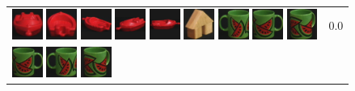 \begin{figure}[!p]
\begin{center}
\begin{tabular}{m{11cm} | m{3cm} |}
\includegraphics[width=1cm]{coil/beeld-20.eps}
\includegraphics[width=1cm]{coil/beeld-23.eps}
\includegraphics[width=1cm]{coil/beeld-22.eps}
\includegraphics[width=1cm]{coil/beeld-21.eps}
\includegraphics[width=1cm]{coil/beeld-19.eps}
\includegraphics[width=1cm]{coil/beeld-45.eps}
\includegraphics[width=1cm]{coil/beeld-31.eps}
\includegraphics[width=1cm]{coil/beeld-30.eps}
\includegraphics[width=1cm]{coil/beeld-33.eps}
& {\scriptsize 0.0}
\\
\includegraphics[width=1cm]{coil/beeld-30.eps}
\includegraphics[width=1cm]{coil/beeld-31.eps}
\includegraphics[width=1cm]{coil/beeld-33.eps}

\end{tabular}
\end{center}
\end{figure}
